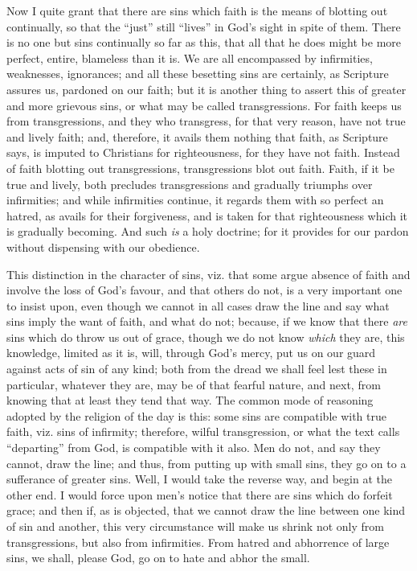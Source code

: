 Now I quite grant that there are sins which faith is the means of
blotting out continually, so that the ``just'' still
``lives'' in God's sight in spite of them. There is no one but
sins continually so far as this, that all that he does might be more
perfect, entire, blameless than it is. We are all encompassed by
infirmities, weaknesses, ignorances; and all these besetting sins are
certainly, as Scripture assures us, pardoned on our faith; but it is
another thing to assert this of greater and more grievous sins, or
what may be called transgressions. For faith keeps us from
transgressions, and they who transgress, for that very reason, have
not true and lively faith; and, therefore, it avails them nothing that
faith, as Scripture says, is imputed to Christians for righteousness,
for they have not faith. Instead of faith blotting out transgressions,
transgressions blot out faith. Faith, if it be true and lively, both
precludes transgressions and gradually triumphs over infirmities; and
while infirmities continue, it regards them with so perfect an hatred,
as avails for their forgiveness, and is taken for that righteousness
which it is gradually becoming. And such \emph{is} a holy doctrine;
for it provides for our pardon without dispensing with our obedience.

This distinction in the character of sins, viz. that some argue
absence of faith and involve the loss of God's favour, and that others
do not, is a very important one to insist upon, even though we cannot
in all cases draw the line and say what sins imply the want of faith,
and what do not; because, if we know that there \emph{are} sins which
do throw us out of grace, though we do not know \emph{which} they are,
this knowledge, limited as it is, will, through God's mercy, put us on
our guard against acts of sin of any kind; both from the dread we
shall feel lest these in particular, whatever they are, may be of that
fearful nature, and next, from knowing that at least they tend that
way. The common mode of reasoning adopted by the religion of the day
is this: some sins are compatible with true faith, viz. sins of
infirmity; therefore, wilful transgression, or what the text calls
``departing'' from God, is compatible with it also. Men do
not, and say they cannot, draw the line; and thus, from putting up
with small sins, they go on to a sufferance of greater sins. Well, I
would take the reverse way, and begin at the other end. I would force
upon men's notice that there are sins which do forfeit grace; and then
if, as is objected, that we cannot draw the line between one kind of
sin and another, this very circumstance will make us shrink not only
from transgressions, but also from infirmities. From hatred and
abhorrence of large sins, we shall, please God, go on to hate and
abhor the small.

